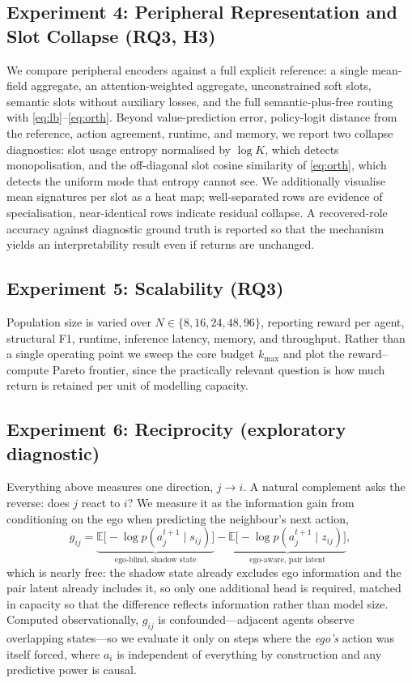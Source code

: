 \documentclass[conference]{IEEEtran}
\begin{document}
\subsection{Experiment 4: Peripheral Representation and Slot Collapse (RQ3, H3)}

We compare peripheral encoders against a full explicit reference: a single mean-field aggregate, an attention-weighted aggregate, unconstrained soft slots, semantic slots without auxiliary losses, and the full semantic-plus-free routing with \eqref{eq:lb}--\eqref{eq:orth}. Beyond value-prediction error, policy-logit distance from the reference, action agreement, runtime, and memory, we report two collapse diagnostics: slot usage entropy normalised by $\log K$, which detects monopolisation, and the off-diagonal slot cosine similarity of \eqref{eq:orth}, which detects the uniform mode that entropy cannot see. We additionally visualise mean signatures per slot as a heat map; well-separated rows are evidence of specialisation, near-identical rows indicate residual collapse. A recovered-role accuracy against diagnostic ground truth is reported so that the mechanism yields an interpretability result even if returns are unchanged.

\subsection{Experiment 5: Scalability (RQ3)}

Population size is varied over $N\in\{8,16,24,48,96\}$, reporting reward per agent, structural F1, runtime, inference latency, memory, and throughput. Rather than a single operating point we sweep the core budget $k_{\max}$ and plot the reward--compute Pareto frontier, since the practically relevant question is how much return is retained per unit of modelling capacity.

\subsection{Experiment 6: Reciprocity (exploratory diagnostic)}

Everything above measures one direction, $j\to i$. A natural complement asks the reverse: does $j$ react to $i$? We measure it as the information gain from conditioning on the ego when predicting the neighbour's next action,
\begin{equation}
g_{ij}=\underbrace{\mathbb{E}\big[-\log p(a_j^{t+1}\mid s_{ij})\big]}_{\text{ego-blind, shadow state}}-\underbrace{\mathbb{E}\big[-\log p(a_j^{t+1}\mid z_{ij})\big]}_{\text{ego-aware, pair latent}},
\label{eq:reciprocity}
\end{equation}
which is nearly free: the shadow state already excludes ego information and the pair latent already includes it, so only one additional head is required, matched in capacity so that the difference reflects information rather than model size. Computed observationally, $g_{ij}$ is confounded---adjacent agents observe overlapping states---so we evaluate it only on steps where the \emph{ego's} action was itself forced, where $a_i$ is independent of everything by construction and any predictive power is causal.
\end{document}
